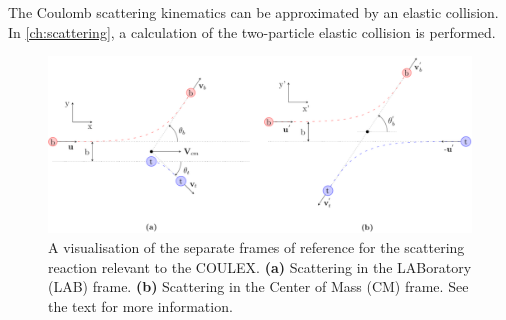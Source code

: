 \documentclass[twoside,english]{uiofysmaster/uiofysmaster}
\let\orgautoref\autoref
\renewcommand{\autoref}
        {%
		 \def\sectionautorefname{Section}%
		 \def\subsectionautorefname{Section}%
		 \def\subsubsectionautorefname{Section}%
		 \def\chapterautorefname{Chapter}%
          \orgautoref}
\begin{document}
The Coulomb scattering kinematics can be approximated by an elastic collision.
In \autoref{ch:scattering}, a calculation of the two-particle elastic collision is performed.

\begin{figure}[htb]
	\centering
	\includegraphics[width=\textwidth]{Images/scattering.png}
	\caption{A visualisation of the separate frames of reference for the scattering reaction relevant to the COULEX.
	\textbf{(a)} Scattering in the LABoratory (LAB) frame. 
	\textbf{(b)} Scattering in the Center of Mass (CM) frame. 
	See the text for more information.}
	\label{fig:scattering}
\end{figure}

%		
%		
\end{document}
